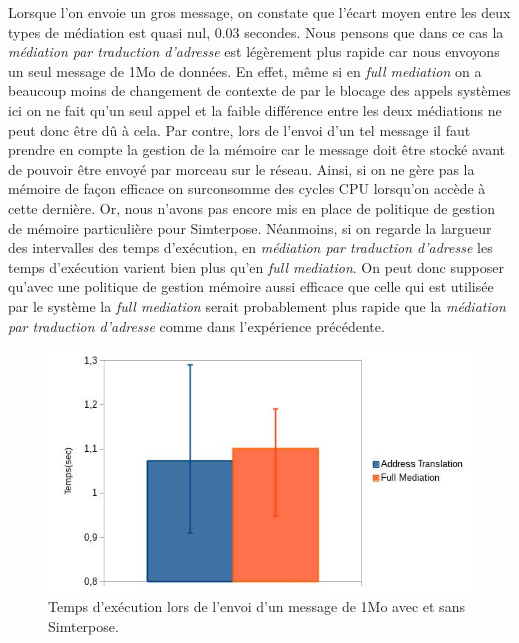 Lorsque l'on envoie un gros message, on constate que l'écart moyen entre les deux types de médiation est quasi nul, 0.03 secondes. Nous pensons que dans ce cas la \textit{médiation par traduction d'adresse} est légèrement plus rapide car nous envoyons un seul message de 1Mo de données. En effet, même si en \textit{full mediation} on a beaucoup moins de changement de contexte de par le blocage des appels systèmes ici on ne fait qu'un seul appel et la faible différence entre les deux médiations ne peut donc être dû à cela. Par contre, lors de l'envoi d'un tel message il faut prendre en compte la gestion de la mémoire car le message doit être stocké avant de pouvoir être envoyé par morceau sur le réseau. Ainsi, si on ne gère pas la mémoire de façon efficace on surconsomme des cycles CPU lorsqu'on accède à cette dernière. Or, nous n'avons pas encore mis en place de politique de gestion de mémoire particulière pour Simterpose. Néanmoins, si on regarde la largueur des intervalles des temps d'exécution, en \textit{médiation par traduction d'adresse} les temps d'exécution varient bien plus qu'en \textit{full mediation}. On peut donc supposer qu'avec une politique de gestion mémoire aussi efficace que celle qui est utilisée par le système la \textit{full mediation} serait probablement plus rapide que la \textit{médiation par traduction d'adresse} comme dans l'expérience précédente.

\begin{figure}
  \centering
    \includegraphics[scale=0.5]{mesures/graph/Bigmsg.jpg}
    \caption{Temps d'exécution lors de l'envoi d'un message de 1Mo avec et sans Simterpose.}
    \label{Network_Big_Mediation}
\end{figure}

